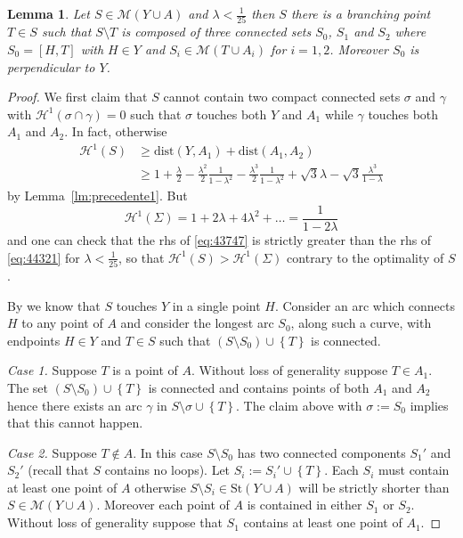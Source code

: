 \documentclass{article}
\renewcommand{\H}{\mathcal H}
\newcommand{\ENCLOSE}[1]{\left\{#1\right\}}
\newcommand{\St}{\mathrm{St}}
\newcommand{\M}{\mathcal{M}}
\renewcommand{\H}{\mathcal{H}}
\newcommand{\dist}{\mathrm{dist}}
\newtheorem{lemma}[theorem]{Lemma}
\theoremstyle{definition}
\theoremstyle{remark}
\begin{document}
\begin{lemma}\label{lm:branching}
Let $S\in \M(Y\cup A)$
and $\lambda < \frac 1 {25}$ then $S$ 
there is a branching point $T\in S$ 
such that $S\setminus T$ is composed of 
three connected sets $S_0$, $S_1$ and $S_2$ 
where $S_0 = [H,T]$ with $H\in Y$ and  
$S_i \in \M(T\cup A_i)$ for $i=1,2$.
Moreover $S_0$ is perpendicular to $Y$.
\end{lemma}
\begin{proof}
We first claim that $S$ cannot contain 
two compact connected sets 
$\sigma$ and $\gamma$
with $\H^1(\sigma\cap \gamma)=0$
such that $\sigma$ touches both $Y$ and $A_1$ 
while $\gamma$ touches both $A_1$ and $A_2$.
In fact, otherwise
\begin{equation}
\label{eq:43747}
\begin{aligned}
  \H^1(S)
  &\ge \dist(Y, A_1) + \dist(A_1, A_2)
  \\
  &\ge 
  1+ \frac{\lambda} 2 
    - \frac{\lambda^2}{2}\frac{1}{1-\lambda^2}
    - \frac{\lambda^3}{2}\frac{1}{1-\lambda^2} 
   +
   \sqrt 3 \lambda - \sqrt 3 \frac{\lambda^3}{1-\lambda}
\end{aligned}
\end{equation}
by Lemma~\ref{lm:precedente1}.
But 
\begin{equation}\label{eq:44321}
  \H^1(\Sigma) 
  = 1 + 2 \lambda + 4 \lambda^2 + \dots 
  = \frac{1}{1-2\lambda}
\end{equation}
and one can check that the rhs of \eqref{eq:43747} is
strictly greater than the rhs of \eqref{eq:44321}
for $\lambda < \frac 1 {25}$,
so that $\H^1(S) > \H^1(\Sigma)$ contrary 
to the optimality of $S$.

By \cite{PaoSte} we know that $S$ touches $Y$ in a single point $H$.
Consider an arc which connects $H$ to any point of $A$ 
and consider the longest arc $S_0$, along such a curve, 
with endpoints $H\in Y$ and $T\in S$
such that $(S\setminus S_0) \cup \ENCLOSE{T}$ is connected.

\emph{Case 1.} Suppose $T$ is a point of $A$. 
Without loss of generality suppose $T\in A_1$.
The set $(S\setminus S_0)\cup\ENCLOSE{T}$ 
is connected and contains points of both $A_1$ 
and $A_2$ hence there exists an arc $\gamma$ in $S\setminus \sigma\cup\ENCLOSE{T}$.
The claim above with $\sigma:=S_0$ implies that this cannot happen.

\emph{Case 2.} Suppose $T\not \in A$.
In this case $S\setminus S_0$ has two connected components 
$S_1'$ and $S_2'$ (recall that $S$ contains no loops). 
Let $S_i:=S_i'\cup \ENCLOSE{T}$.
Each $S_i$ must contain at least one point of $A$ otherwise 
$S\setminus S_i\in \St(Y\cup A)$ will be 
strictly shorter than $S\in \M(Y\cup A)$.
Moreover each point of $A$ is contained in either $S_1$ or $S_2$.
Without loss of generality suppose that $S_1$ 
contains at least one point of $A_1$.


\end{proof}
\end{document}
